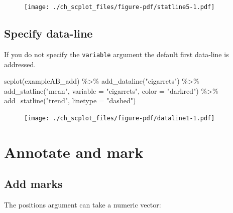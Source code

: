 \documentclass[
  letterpaper,
  DIV=11,
  numbers=noendperiod]{scrreprt}
\newenvironment{Shaded}{\begin{snugshade}}{\end{snugshade}}
\newcommand{\AttributeTok}[1]{\textcolor[rgb]{0.40,0.45,0.13}{#1}}
\newcommand{\FunctionTok}[1]{\textcolor[rgb]{0.28,0.35,0.67}{#1}}
\newcommand{\NormalTok}[1]{\textcolor[rgb]{0.00,0.23,0.31}{#1}}
\newcommand{\SpecialCharTok}[1]{\textcolor[rgb]{0.37,0.37,0.37}{#1}}
\newcommand{\StringTok}[1]{\textcolor[rgb]{0.13,0.47,0.30}{#1}}
\begin{document}
\begin{figure}[H]

{\centering \texttt{[image: ./ch\_scplot\_files/figure-pdf/statline5-1.pdf]}

}

\end{figure}

\hypertarget{specify-data-line}{%
\subsection{Specify data-line}\label{specify-data-line}}

If you do not specify the \texttt{variable} argument the default first
data-line is addressed.

\begin{Shaded}
\begin{Highlighting}[]
\FunctionTok{scplot}\NormalTok{(exampleAB\_add) }\SpecialCharTok{\%\textgreater{}\%}
  \FunctionTok{add\_dataline}\NormalTok{(}\StringTok{"cigarrets"}\NormalTok{) }\SpecialCharTok{\%\textgreater{}\%}
  \FunctionTok{add\_statline}\NormalTok{(}\StringTok{"mean"}\NormalTok{, }\AttributeTok{variable =} \StringTok{"cigarrets"}\NormalTok{, }\AttributeTok{color =} \StringTok{"darkred"}\NormalTok{) }\SpecialCharTok{\%\textgreater{}\%}
  \FunctionTok{add\_statline}\NormalTok{(}\StringTok{"trend"}\NormalTok{, }\AttributeTok{linetype =} \StringTok{"dashed"}\NormalTok{)}
\end{Highlighting}
\end{Shaded}

\begin{figure}[H]

{\centering \texttt{[image: ./ch\_scplot\_files/figure-pdf/dataline1-1.pdf]}

}

\end{figure}

\hypertarget{annotate-and-mark}{%
\section{Annotate and mark}\label{annotate-and-mark}}

\hypertarget{add-marks}{%
\subsection{Add marks}\label{add-marks}}

The positions argument can take a numeric vector:
\end{document}
